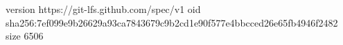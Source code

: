 version https://git-lfs.github.com/spec/v1
oid sha256:7ef099e9b26629a93ca7843679c9b2cd1e90f577e4bbcced26e65fb4946f2482
size 6506
